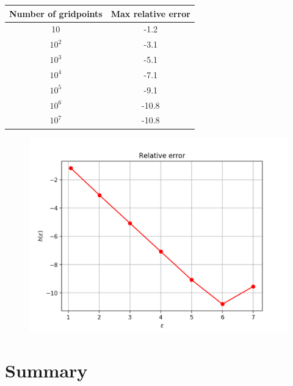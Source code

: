 \documentclass[10pt]{article}
\begin{document}
\begin{center}
  \begin{tabular}{||c|c||}

    \hline\hline Number of gridpoints & Max relative error \\
    \hline
    10 & -1.2 \\
    \hline
    $10^2$ & -3.1 \\
    \hline
    $10^3$ & -5.1 \\ 
    \hline
    $10^4$ & -7.1 \\
    \hline
    $10^5$ & -9.1 \\ 
    \hline
    $10^6$ & -10.8\\
    \hline
    $10^7$ & -10.8\\
    \hline\hline
    
  \end{tabular}
\end{center}

\begin{figure}[H]
  \centering  
  \includegraphics[scale=0.5]{relative_error.png}
\end{figure}

\section{Summary}

\printbibliography
\end{document}
